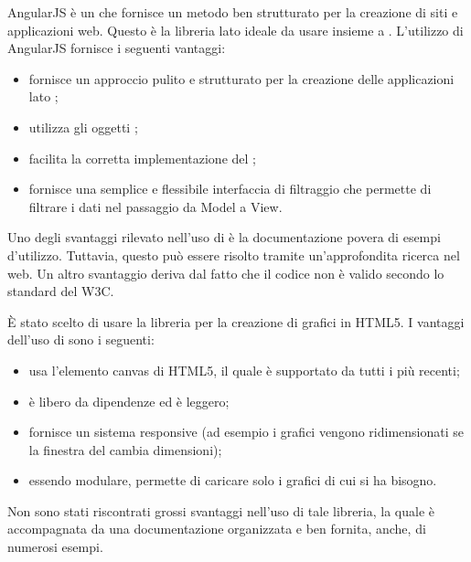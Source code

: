AngularJS è un    che fornisce un metodo ben strutturato per la creazione di siti e applicazioni web. Questo  è la libreria lato  ideale da usare insieme a .
L'utilizzo di AngularJS fornisce i seguenti vantaggi:
\begin{itemize}
\item fornisce un approccio pulito e strutturato per la creazione delle applicazioni lato ;
\item utilizza gli oggetti ;
\item facilita la corretta implementazione del  ;
\item fornisce una semplice e flessibile interfaccia di filtraggio che permette di filtrare i dati nel passaggio da Model a View.
\end{itemize}
Uno degli svantaggi rilevato nell'uso di  è la documentazione povera di esempi d'utilizzo. Tuttavia, questo può essere risolto tramite un'approfondita ricerca nel web. Un altro svantaggio deriva dal fatto che il codice non è valido secondo lo standard del W3C. 

È stato scelto di usare la libreria   per la creazione di grafici in HTML5.
I vantaggi dell'uso di  sono i seguenti:
\begin{itemize}
\item usa l'elemento canvas di HTML5, il quale è supportato da tutti i  più recenti;
\item è libero da dipendenze ed è leggero;
\item fornisce un sistema responsive (ad esempio i grafici vengono ridimensionati se la finestra del  cambia dimensioni);
\item essendo modulare, permette di caricare solo i grafici di cui si ha bisogno.
\end{itemize}
Non sono stati riscontrati grossi svantaggi nell'uso di tale libreria, la quale è accompagnata da una documentazione organizzata e ben fornita, anche, di numerosi esempi.

